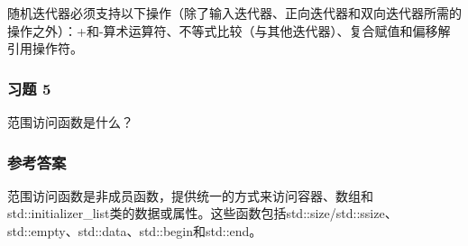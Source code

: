 随机迭代器必须支持以下操作（除了输入迭代器、正向迭代器和双向迭代器所需的操作之外）：+和-算术运算符、不等式比较（与其他迭代器）、复合赋值和偏移解引用操作符。

\subsubsection{习题 5}

范围访问函数是什么？

\subsubsection{参考答案}

范围访问函数是非成员函数，提供统一的方式来访问容器、数组和std::initializer\_list类的数据或属性。这些函数包括std::size/std::ssize、std::empty、std::data、std::begin和std::end。












